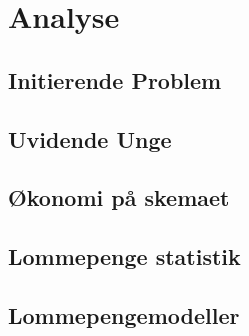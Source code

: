 





\chapter{Analyse}
\clearpage

\section{Initierende Problem}


\section{Uvidende Unge}


\section{Økonomi på skemaet}


\section{Lommepenge statistik}


\section{Lommepengemodeller}






